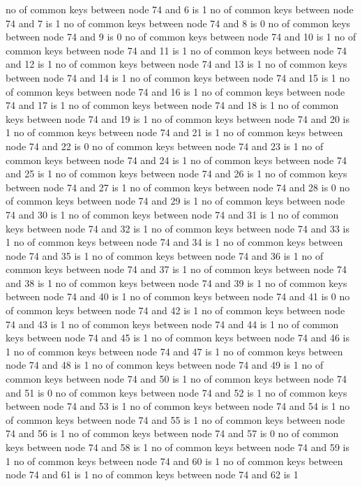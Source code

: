 no of common keys between node 74 and 6 is 1
no of common keys between node 74 and 7 is 1
no of common keys between node 74 and 8 is 0
no of common keys between node 74 and 9 is 0
no of common keys between node 74 and 10 is 1
no of common keys between node 74 and 11 is 1
no of common keys between node 74 and 12 is 1
no of common keys between node 74 and 13 is 1
no of common keys between node 74 and 14 is 1
no of common keys between node 74 and 15 is 1
no of common keys between node 74 and 16 is 1
no of common keys between node 74 and 17 is 1
no of common keys between node 74 and 18 is 1
no of common keys between node 74 and 19 is 1
no of common keys between node 74 and 20 is 1
no of common keys between node 74 and 21 is 1
no of common keys between node 74 and 22 is 0
no of common keys between node 74 and 23 is 1
no of common keys between node 74 and 24 is 1
no of common keys between node 74 and 25 is 1
no of common keys between node 74 and 26 is 1
no of common keys between node 74 and 27 is 1
no of common keys between node 74 and 28 is 0
no of common keys between node 74 and 29 is 1
no of common keys between node 74 and 30 is 1
no of common keys between node 74 and 31 is 1
no of common keys between node 74 and 32 is 1
no of common keys between node 74 and 33 is 1
no of common keys between node 74 and 34 is 1
no of common keys between node 74 and 35 is 1
no of common keys between node 74 and 36 is 1
no of common keys between node 74 and 37 is 1
no of common keys between node 74 and 38 is 1
no of common keys between node 74 and 39 is 1
no of common keys between node 74 and 40 is 1
no of common keys between node 74 and 41 is 0
no of common keys between node 74 and 42 is 1
no of common keys between node 74 and 43 is 1
no of common keys between node 74 and 44 is 1
no of common keys between node 74 and 45 is 1
no of common keys between node 74 and 46 is 1
no of common keys between node 74 and 47 is 1
no of common keys between node 74 and 48 is 1
no of common keys between node 74 and 49 is 1
no of common keys between node 74 and 50 is 1
no of common keys between node 74 and 51 is 0
no of common keys between node 74 and 52 is 1
no of common keys between node 74 and 53 is 1
no of common keys between node 74 and 54 is 1
no of common keys between node 74 and 55 is 1
no of common keys between node 74 and 56 is 1
no of common keys between node 74 and 57 is 0
no of common keys between node 74 and 58 is 1
no of common keys between node 74 and 59 is 1
no of common keys between node 74 and 60 is 1
no of common keys between node 74 and 61 is 1
no of common keys between node 74 and 62 is 1

